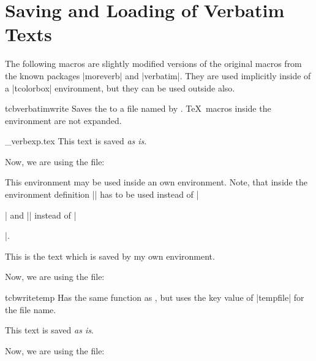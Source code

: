 \clearpage
\section{Saving and Loading of Verbatim Texts}%
%
The following macros are slightly modified versions of the original macros
from the known packages |moreverb| and |verbatim|.
They are used implicitly inside of a |tcolorbox| environment,
but they can be used outside also.
\enlargethispage*{1.5cm}

\begin{docEnvironment}{tcbverbatimwrite}{}
  Saves the  to a file named by .
  \TeX\ macros inside the environment are not expanded.
\begin{dispExample}
\begin{tcbverbatimwrite}{\jobname_verbexp.tex}
  This text is saved \textit{as is}.
\end{tcbverbatimwrite}

Now, we are using the file:\par

\end{dispExample}

This environment may be used inside an own environment. Note, that inside
the environment definition |\tcbverbatimwrite| has to be used instead of
|\begin{tcbverbatimwrite}| and |\endtcbverbatimwrite| instead of |\end{tcbverbatimwrite}|.
\begin{dispExample}
\newenvironment{myverbatim}{%
  \begingroup{}}%
  {\endtcbverbatimwrite\endgroup}

\begin{myverbatim}
  This is the text which is saved by my own environment.
\end{myverbatim}

Now, we are using the file:\par

\end{dispExample}
\end{docEnvironment}

\begin{docEnvironment}{tcbwritetemp}{}
  Has the same function as , but uses the key value
  of |tempfile| for the file name.
\begin{dispExample}
\begin{tcbwritetemp}
  This text is saved \textit{as is}.
\end{tcbwritetemp}

Now, we are using the file:\par
\tcbusetemp
\end{dispExample}
\end{docEnvironment}


